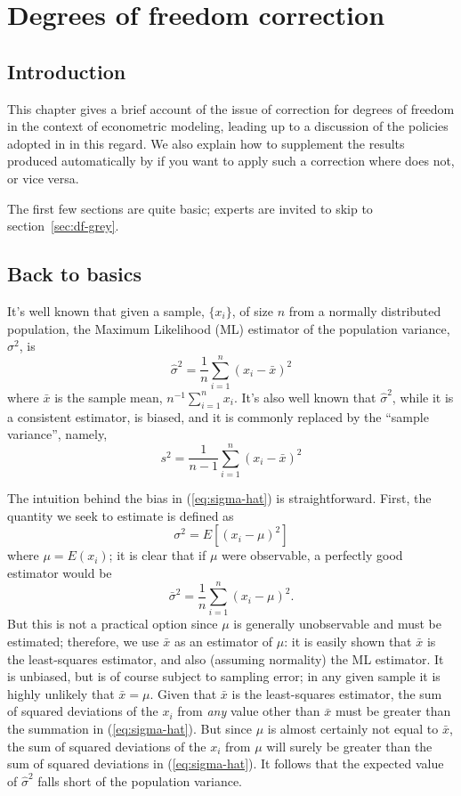 \chapter{Degrees of freedom correction}
\label{chap:df}


\section{Introduction}

This chapter gives a brief account of the issue of correction for
degrees of freedom in the context of econometric modeling, leading
up to a discussion of the policies adopted in  in this
regard.  We also explain how to supplement the results produced 
automatically by  if you want to apply such a correction
where  does not, or vice versa.

The first few sections are quite basic; experts are invited to skip to
section~\ref{sec:df-grey}.

\section{Back to basics}
\label{sec:df-basics}

It's well known that given a sample, $\{x_i\}$, of size $n$ from a
normally distributed population, the Maximum Likelihood (ML) estimator
of the population variance, $\sigma^2$, is
%
\begin{equation}
\label{eq:sigma-hat}
\hat{\sigma}^2 = \frac{1}{n} \sum_{i=1}^n (x_i - \bar{x})^2
\end{equation}
%
where $\bar{x}$ is the sample mean, $n^{-1} \sum_{i=1}^n x_i$.  It's
also well known that $\hat{\sigma}^2$, while it is a consistent
estimator, is biased, and it is commonly replaced by the ``sample
variance'', namely,
%
\begin{equation}
\label{eq:sample-variance}
s^2 = \frac{1}{n-1} \sum_{i=1}^n (x_i - \bar{x})^2
\end{equation}

The intuition behind the bias in (\ref{eq:sigma-hat}) is
straightforward.  First, the quantity we seek to estimate is defined
as
%
\[
\sigma^2 = E\left[(x_i - \mu)^2\right]
\]
%
where $\mu = E(x_i)$; it is clear that if $\mu$ were observable, a
perfectly good estimator would be
%
\[
\bar{\sigma}^2 = \frac{1}{n} \sum_{i=1}^n (x_i - \mu)^2.
\]
%
But this is not a practical option since $\mu$ is generally
unobservable and must be estimated; therefore, we use $\bar{x}$ as an
estimator of $\mu$: it is easily shown that $\bar{x}$ is the
least-squares estimator, and also (assuming normality) the ML
estimator.  It is unbiased, but is of course subject to sampling
error; in any given sample it is highly unlikely that $\bar{x} = \mu$.
Given that $\bar{x}$ is the least-squares estimator, the sum of
squared deviations of the $x_i$ from \textit{any} value other than
$\bar{x}$ must be greater than the summation in (\ref{eq:sigma-hat}).
But since $\mu$ is almost certainly not equal to $\bar{x}$, the sum of
squared deviations of the $x_i$ from $\mu$ will surely be greater than
the sum of squared deviations in (\ref{eq:sigma-hat}). It follows that
the expected value of $\hat{\sigma}^2$ falls short of the population
variance.

